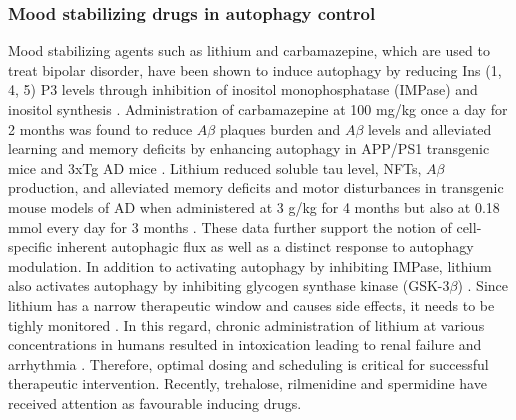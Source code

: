 \subsubsection{Mood stabilizing drugs in autophagy control}
Mood stabilizing agents such as lithium and carbamazepine, which are used to treat bipolar disorder, have been shown to induce autophagy by reducing Ins (1, 4, 5) P3 levels through inhibition of inositol monophosphatase (IMPase) and inositol synthesis \citep{Frake2015,sarkar2013}. Administration of carbamazepine at 100 mg/kg once a day for 2 months was found to reduce $A\beta$ plaques burden and $A\beta$ levels and alleviated learning and memory deficits by enhancing autophagy in APP/PS1 transgenic mice \citep{Li2013} and 3xTg AD mice \citep{Zhang2017}. Lithium reduced soluble tau level, NFTs, $A\beta$ production, and alleviated memory deficits and motor disturbances in transgenic mouse models of AD when administered at 3 g/kg for 4 months \citep{Shimada2012} but also at 0.18 mmol every day for 3 months \citep{Zhang2011}. These data further support the notion of cell-specific inherent autophagic flux as well as a distinct response to autophagy modulation. In addition to activating autophagy by inhibiting IMPase, lithium also activates autophagy by inhibiting glycogen synthase kinase (GSK-3$\beta$) \citep{Gonzalez-Polo2015,sarkar2013,Sarkar2007}. Since lithium has a narrow therapeutic window and causes side effects, it needs to be tighly monitored \citep{Gonzalez-Polo2015}. In this regard, chronic administration of lithium at various concentrations in humans resulted in intoxication leading to renal failure and arrhythmia \citep{Chan2012,Gonzalez-Polo2015,Menegueti2012,Rej2012}. Therefore, optimal dosing and scheduling is critical for successful therapeutic intervention. Recently, trehalose, rilmenidine and spermidine have received attention as favourable inducing drugs.


